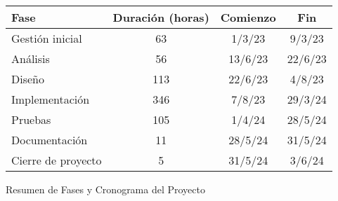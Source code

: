 \begin{planificacion}
	\centering
	\begin{tabular}{ | m{9cm} | c | c | c |}
		\hline
		\textbf{Fase}      & \textbf{Duración (horas)} & \textbf{Comienzo} & \textbf{Fin} \\
		\hline
		Gestión inicial    & 63                        & 1/3/23            & 9/3/23       \\
		\hline
		Análisis           & 56                        & 13/6/23           & 22/6/23      \\
		\hline
		Diseño             & 113                       & 22/6/23           & 4/8/23       \\
		\hline
		Implementación     & 346                       & 7/8/23            & 29/3/24      \\
		\hline
		Pruebas            & 105                       & 1/4/24            & 28/5/24      \\
		\hline
		Documentación      & 11                        & 28/5/24           & 31/5/24      \\
		\hline
		Cierre de proyecto & 5                         & 31/5/24           & 3/6/24       \\
		\hline
	\end{tabular}
	\caption{Resumen de Fases y Cronograma del Proyecto}
\end{planificacion}
